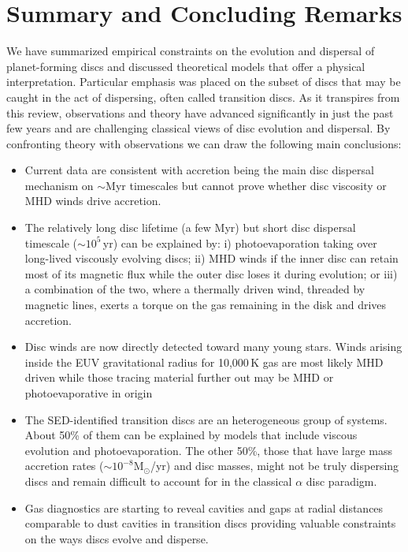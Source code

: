 \documentclass{rsos}
\begin{document}
\section{Summary and Concluding Remarks}\label{sect:summary}
We have summarized empirical constraints on the evolution and dispersal of planet-forming discs and discussed theoretical models that offer a physical interpretation. Particular emphasis was placed on the subset of discs that may be caught in the act of dispersing, often called transition discs.
As it transpires from this review, observations and theory have advanced significantly in just the past few years and are challenging classical views of disc evolution and dispersal. By confronting theory with observations we can draw the following main conclusions: 

\begin{itemize}
\item Current data are consistent with accretion being the main disc dispersal mechanism on $\sim$Myr timescales but cannot prove whether disc viscosity or MHD winds drive accretion.
\item The relatively long disc lifetime (a few Myr) but short disc dispersal timescale ($\sim 10^5$\,yr) can be explained by: i) photoevaporation taking over long-lived viscously evolving discs; ii) MHD winds if the inner disc can retain most of its magnetic flux while the outer disc loses it during evolution; or iii) a combination of the two, where a thermally driven wind, threaded by magnetic lines, exerts a torque on
the gas remaining in the disk and drives accretion.
\item Disc winds are now directly detected toward many young stars. Winds arising inside the EUV gravitational radius for 10,000\,K gas are most likely MHD driven while those tracing material further out may be MHD or photoevaporative in origin
\item The SED-identified transition discs are an heterogeneous group of systems. About 50\% of them can be explained by models that include viscous evolution and photoevaporation. The other 50\%, those that have large mass accretion rates ($\sim 10^{-8}$M$_\odot$/yr) and disc masses, might not be truly dispersing discs and remain difficult to account for in the classical $\alpha$ disc paradigm.
\item Gas diagnostics are starting to reveal cavities and gaps at radial distances comparable to dust cavities in transition discs providing valuable constraints on the ways discs evolve and disperse.
\end{itemize}
\end{document}
